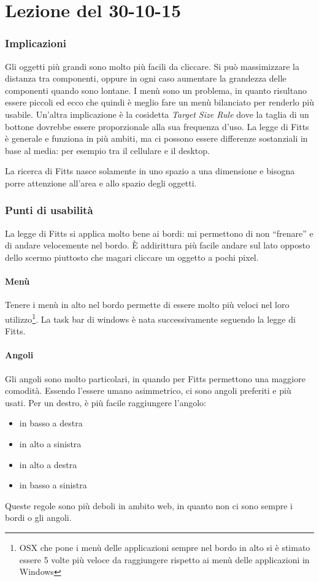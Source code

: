 \section{Lezione del 30-10-15}
\graphicspath{ {res/data/30-10-15/} }

\subsubsection{Implicazioni}

Gli oggetti pi\`u grandi sono molto pi\`u  facili da cliccare. Si pu\`o massimizzare la distanza tra componenti, oppure in ogni caso aumentare la grandezza delle componenti quando sono lontane.
I men\`u sono un problema, in quanto risultano essere piccoli ed ecco che quindi \`e meglio fare un men\`u bilanciato per renderlo pi\`u usabile.
Un'altra implicazione \`e la cosidetta \textit{Target Size Rule} dove la taglia di un bottone dovrebbe essere proporzionale alla sua frequenza d'uso.
La legge di Fitts \`e generale e funziona in pi\`u ambiti, ma ci possono essere differenze sostanziali in base al media: per esempio tra il cellulare e il desktop.

La ricerca di Fitts nasce solamente in uno spazio a una dimensione e bisogna porre attenzione all'area e allo spazio degli oggetti.

\subsubsection{Punti di usabilit\`a} La legge di Fitts si applica molto bene ai bordi: mi permettono di non ``frenare'' e di andare velocemente nel bordo. \`E addirittura pi\`u facile andare sul lato opposto dello scermo piuttosto che magari cliccare un oggetto a pochi pixel.
\paragraph*{Men\`u}Tenere i men\`u in alto nel bordo permette di essere molto pi\`u veloci nel loro utilizzo\footnote{OSX che pone i men\`u delle applicazioni sempre nel bordo in alto si \`e stimato essere 5 volte pi\`u veloce da raggiungere rispetto ai men\`u delle applicazioni in Windows}. La task bar di windows \`e nata successivamente seguendo la legge di Fitts.
\paragraph{Angoli}Gli angoli sono molto particolari, in quando per Fitts permettono una maggiore comodit\`a. Essendo l'essere umano asimmetrico, ci sono angoli preferiti e pi\`u usati. Per un destro, \`e pi\`u facile raggiungere l'angolo:
\begin{itemize}
\item in basso a destra
\item in alto a sinistra
\item in alto a destra
\item in basso a sinistra
\end{itemize}
Queste regole sono pi\`u deboli in ambito web, in quanto non ci sono sempre i bordi o gli angoli.
